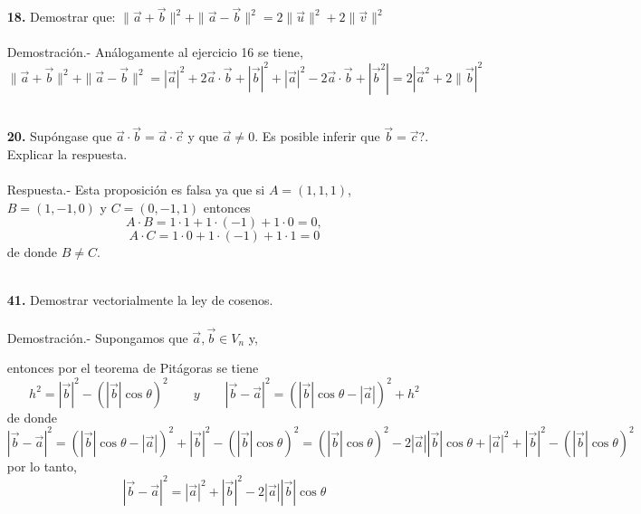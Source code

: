 \begin{enumerate}

\item [\Large\bfseries 18.] Demostrar que: $\|\vec{a}+\vec{b}\|^2 + \|\vec{a}-\vec{b}\|^2 = 2\|\vec{u}\|^2+2\|\vec{v}\|^2$\\\\
    Demostración.-\; Análogamente al ejercicio 16 se tiene, 
    $$\|\vec{a}+\vec{b}\|^2 + \|\vec{a}-\vec{b}\|^2 = |\vec{a}|^2 + 2\vec{a}\cdot \vec{b} + |\vec{b}|^2 + |\vec{a}|^2 - 2\vec{a} \cdot \vec{b} + |\vec{b}^2| = 2|\vec{a}^2 + 2\|\vec{b}|^2$$\\


\item [\Large\bfseries 20.] Supóngase que $\vec{a}\cdot \vec{b} = \vec{a}\cdot \vec{c}$ y que $\vec{a}\neq 0$. Es posible inferir que $\vec{b}=\vec{c}$?. Explicar la respuesta.\\\\
    Respuesta.-\; Esta proposición es falsa ya que si $A=(1,1,1)$, $B=(1,-1,0)$ y $C=(0,-1,1)$ entonces $$A\cdot B = 1\cdot 1 + 1\cdot(-1)+1\cdot 0 = 0,$$ $$A\cdot C = 1\cdot 0 + 1\cdot(-1)+1\cdot 1 = 0$$
    de donde $B\neq C$.\\\\ 

\item [\Large\bfseries 41.] Demostrar vectorialmente la ley de cosenos.\\\\
    Demostración.-\; Supongamos que $\vec{a},\vec{b} \in V_n$ y, 
    \begin{center}
    \end{center}
    entonces por el teorema de Pitágoras se tiene $$h^2=|\vec{b}|^2 - \left(|\vec{b}|\cos \theta\right)^2 \qquad y \qquad |\vec{b}-\vec{a}|^2 = \left(|\vec{b}|\cos \theta - |\vec{a}|\right)^2+h^2$$
    de donde $$|\vec{b}-\vec{a}|^2 = \left(|\vec{b}|\cos \theta - |\vec{a}|\right)^2+|\vec{b}|^2 - \left(|\vec{b}|\cos \theta\right)^2 = \left(|\vec{b}|\cos \theta\right)^2 - 2|\vec{a}||\vec{b}|\cos \theta + |\vec{a}|^2 + |\vec{b}|^2 - \left(|\vec{b}|\cos \theta\right)^2$$
    por lo tanto, $$|\vec{b}-\vec{a}|^2 = |\vec{a}|^2 + |\vec{b}|^2 - 2|\vec{a}||\vec{b}|\cos \theta $$\\


    


\end{enumerate}


